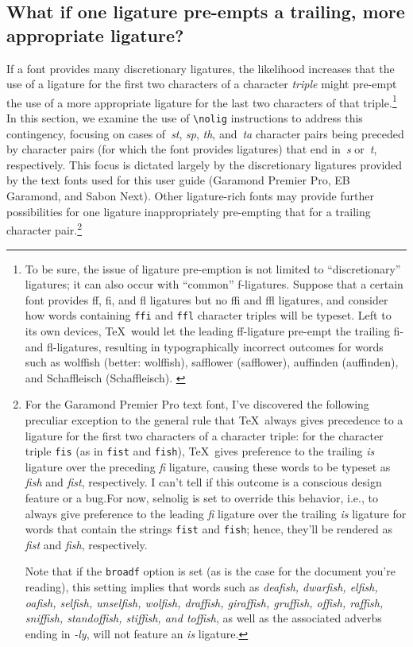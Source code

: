 \documentclass[11pt]{article}
\newcommand{\pkg}[1]{\textsf{#1}}
\newcommand{\opt}[1]{\texttt{#1}}
\newcommand{\cmmd}[1]{\texttt{\textbackslash #1}}
\begin{document}
\subsection{What if one ligature pre-empts a trailing, more appropriate ligature?} \label{sec:preempt}

If a font provides many discretionary ligatures, the likelihood increases that the use of a ligature for the first two characters of a character \emph{triple} might pre-empt the use of a more appropriate ligature for the last two characters of that triple.\footnote{To be sure, the issue of ligature pre-emption is not limited to \enquote{discretionary} ligatures; it can also occur with \enquote{common} f-ligatures. Suppose that a certain font provides ff, fi, and fl ligatures but no ffi and ffl ligatures, and consider how words containing \opt{ffi} and \opt{ffl} character triples will be typeset. Left to its own devices, \TeX\ would let the leading ff-ligature pre-empt the trailing fi- and fl-ligatures, resulting in typographically incorrect outcomes for words such as wol\mbox{ff}ish (better: wolf\mbox{fi}sh), sa\mbox{ff}lower (safflower), au\mbox{ff}inden (auffinden), and Scha\mbox{ff}leisch (Schaffleisch). \label{fn:triple}} 
In this section, we examine the use of \cmmd{nolig} instructions to address this contingency, focusing on cases of~\emph{st}, \emph{sp}, \emph{th}, and~\emph{ta} character pairs being preceded by character pairs (for which the font provides ligatures) that end in~\emph{s} or~\emph{t}, respectively. This focus is dictated largely by the discretionary ligatures provided by the text fonts used for this user guide (Garamond Premier Pro, EB Garamond, and Sabon Next). Other ligature-rich fonts may provide further possibilities for one ligature inappropriately pre-empting that for a trailing character pair.\footnote{For the Garamond Premier Pro text font, I've discovered the following preculiar exception to the general rule that \TeX\ always gives precedence to a ligature for the first two characters of a character triple: for the character triple \opt{fis} (as in \opt{fist} and \opt{fish}), \TeX\ gives preference to the trailing \emph{is} ligature over the preceding \emph{fi} ligature, causing these words to be typeset as \emph{f\mbox{is}h} and \emph{f\mbox{is}t}, respectively. I can't tell if this outcome is a conscious design feature or a bug.For now, \pkg{selnolig} is set to override this behavior, i.e., to always give preference to the leading \emph{fi} ligature over the trailing \emph{is} ligature for words that contain the strings \opt{fist} and \opt{fish}; hence, they'll be rendered as \emph{fist} and \emph{fish}, respectively. 

Note that if the \opt{broadf} option is set (as is the case for the document you're reading), this setting implies that words such as \emph{deafish, dwarfish, elfish, oafish, selfish, unselfish, wolfish, draffish, giraffish, gruffish, offish, raffish, sniffish, standoffish, stiffish, \emph{and} toffish}, as well as the associated adverbs ending in \emph{-ly}, will not feature an \emph{is} ligature.}
\end{document}
